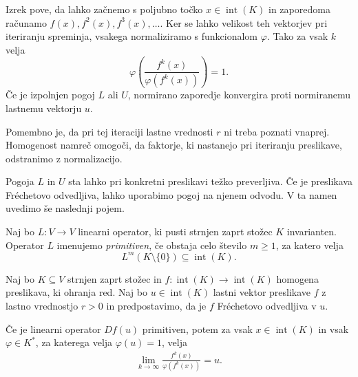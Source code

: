 \documentclass[mat2, tisk]{fmfdelo}
\begin{document}
Izrek pove, da lahko začnemo s poljubno točko
$x\in\operatorname{int}(K)$ in zaporedoma računamo
$f(x),f^2(x),f^3(x),\ldots$. Ker se lahko velikost teh vektorjev pri
iteriranju spreminja, vsakega normaliziramo s funkcionalom
$\varphi$. Tako za vsak $k$ velja
\[
\varphi\left(
\frac{f^k(x)}{\varphi(f^k(x))}
\right)=1.
\]
Če je izpolnjen pogoj $L$ ali $U$, normirano zaporedje konvergira
proti normiranemu lastnemu vektorju $u$.

Pomembno je, da pri tej iteraciji lastne vrednosti $r$ ni treba
poznati vnaprej. Homogenost namreč omogoči, da faktorje, ki nastanejo
pri iteriranju preslikave, odstranimo z normalizacijo.

Pogoja $L$ in $U$ sta lahko pri konkretni preslikavi težko
preverljiva. Če je preslikava Fréchetovo odvedljiva, lahko uporabimo
pogoj na njenem odvodu. V ta namen uvedimo še naslednji pojem.

\begin{definicija}\label{def:primitiven_operator}
  Naj bo $L:V\longrightarrow V$ linearni operator, ki pusti strnjen
  zaprt stožec $K$ invarianten. Operator $L$ imenujemo
  \emph{primitiven}, če obstaja celo število $m\geq1$, za katero velja
  \[
  L^m(K\setminus\{0\})\subseteq\operatorname{int}(K).
  \]
\end{definicija}

\begin{posledica}\label{posledica:konvergenca_primitiven_odvod}
  Naj bo $K\subseteq V$ strnjen zaprt stožec in
  $f:\operatorname{int}(K)\longrightarrow\operatorname{int}(K)$
  homogena preslikava, ki ohranja red. Naj bo
  $u\in\operatorname{int}(K)$ lastni vektor preslikave $f$ z lastno
  vrednostjo $r>0$ in predpostavimo, da je $f$ Fréchetovo odvedljiva
  v $u$.

  Če je linearni operator $Df(u)$ primitiven, potem za vsak
  $x\in\operatorname{int}(K)$ in vsak $\varphi\in K^*$, za katerega
  velja $\varphi(u)=1$, velja
  \begin{align*}
  \lim_{k\to\infty}
  \frac{f^k(x)}{\varphi(f^k(x))}
  =
  u.
  \end{align*}
\end{posledica}
\end{document}
